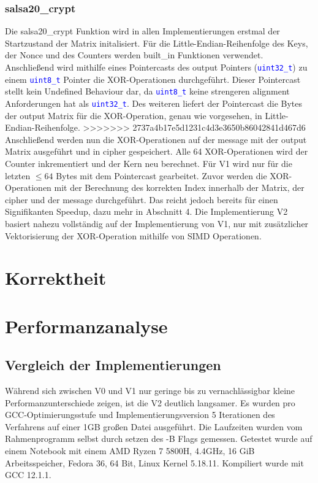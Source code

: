 \documentclass[course=erap]{aspdoc}
\begin{document}
\subsubsection{salsa20\_crypt} \label{crypt}
Die salsa20\_crypt Funktion wird in allen Implementierungen erstmal der Startzustand der Matrix initalisiert. Für die Little-Endian-Reihenfolge des Keys, der Nonce und des Counters werden built\_in Funktionen verwendet.
Anschließend wird mithilfe eines Pointercasts des output Pointers (\texttt{\textcolor{blue}{uint32\_t}}) zu einem \texttt{\textcolor{blue}{uint8\_t}} Pointer die XOR-Operationen durchgeführt. Dieser Pointercast stellt kein Undefined Behaviour dar, 
da \texttt{\textcolor{blue}{uint8\_t}} keine strengeren alignment Anforderungen hat als \texttt{\textcolor{blue}{uint32\_t}}. Des weiteren liefert der Pointercast die Bytes der output Matrix für die XOR-Operation, genau wie vorgesehen, in Little-Endian-Reihenfolge.
>>>>>>> 2737a4b17e5d1231c4d3e3650b86042841d467d6
Anschließend werden nun die XOR-Operationen auf der message mit der output Matrix ausgeführt und in cipher gespeichert. Alle 64 XOR-Operationen wird der Counter inkrementiert und der Kern neu berechnet. Für V1 wird nur für die letzten $\leq 64$ Bytes mit dem Pointercast gearbeitet.
Zuvor werden die XOR-Operationen mit der Berechnung des korrekten Index innerhalb der Matrix, der cipher und der message durchgeführt. Das reicht jedoch bereits für einen Signifikanten Speedup, dazu mehr in Abschnitt 4.
Die Implementierung V2 basiert nahezu vollständig auf der Implementierung von V1, nur mit zusätzlicher Vektorisierung der XOR-Operation mithilfe von SIMD Operationen.


\section{Korrektheit}

\section{Performanzanalyse}
\subsection{Vergleich der Implementierungen}
Während sich zwischen V0 und V1 nur geringe bis zu vernachlässigbar kleine 
Performanzunterschiede zeigen, ist die V2 deutlich langsamer.
Es wurden pro GCC-Optimierungsstufe und Implementierungsversion 5 
Iterationen des Verfahrens auf einer 1GB großen Datei ausgeführt.
Die Laufzeiten wurden vom Rahmenprogramm selbst durch setzen des -B Flags
gemessen. Getestet wurde auf einem Notebook mit einem AMD Ryzen 7 5800H, 
4.4GHz, 16 GiB Arbeitsspeicher, Fedora 36, 64 Bit, Linux Kernel 5.18.11.
Kompiliert wurde mit GCC 12.1.1.
\end{document}
